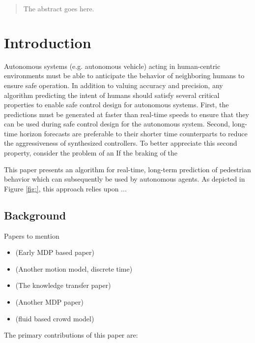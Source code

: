 \documentclass[conference]{IEEEtran}
\begin{document}
\begin{abstract}
The abstract goes here.
\end{abstract}

\IEEEpeerreviewmaketitle

\section{Introduction}

Autonomous systems (e.g. autonomous vehicle) acting in human-centric environments must be able to anticipate the behavior of neighboring humans to ensure safe operation. 
In addition to valuing accuracy and precision, any algorithm predicting the intent of humans should satisfy several critical properties to enable safe control design for autonomous systems.
First, the predictions must be generated at faster than real-time speeds to ensure that they can be used during safe control design for the autonomous system.
Second, long-time horizon forecasts are preferable to their shorter time counterparts to reduce the aggressiveness of synthesized controllers.
To better appreciate this second property, consider the problem of an
If the braking of the 

This paper presents an algorithm for real-time, long-term prediction of pedestrian behavior which can subsequently be used by autonomous agents.
As depicted in Figure \ref{fig:}, this approach relies upon ... 


\subsection{Background}
Papers to mention
\begin{itemize}
	\item \citet{Kitani2012} (Early MDP based paper)
	\item \citet{Karasev2016} (Another motion model, discrete time)
	\item \citet{Ballan2016} (The knowledge transfer paper)
	\item \citet{Ziebart2009} (Another MDP paper)
	\item \citet{Helbing1992} (fluid based crowd model)
\end{itemize}

The primary contributions of this paper are:
\end{document}
